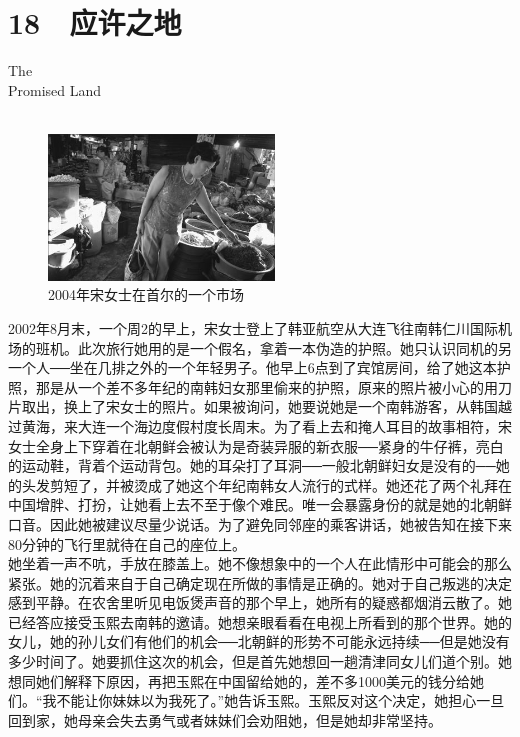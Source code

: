 \fancyhead[RO]{{\tiny{\textcolor{Gray}{\FA \ }}}\thepage}
\fancyhead[LE]{{\tiny{\textcolor{Gray}{\FA \ }}}\thepage}
\fancyfoot[LE,RO]{}
\fancyfoot[LO,CE]{}
\fancyfoot[CO,RE]{}
\chapter*{18 {\FA } 应许之地}
\vspace{5mm}
\begin{flushright}
	\textcolor{PinYinColor}{\EN \huge{The\\
	Promised Land\\
	\ \\}}
\end{flushright}
\begin{figure}[!htbp]
\centering
\includegraphics[width=6cm]{./Chapters/Images/18.jpg}
\caption*{2004年宋女士在首尔的一个市场}
\end{figure}


2002年8月末，一个周2的早上，宋女士登上了韩亚航空从大连飞往南韩仁川国际机场的班机。此次旅行她用的是一个假名，拿着一本伪造的护照。她只认识同机的另一个人──坐在几排之外的一个年轻男子。他早上6点到了宾馆房间，给了她这本护照，那是从一个差不多年纪的南韩妇女那里偷来的护照，原来的照片被小心的用刀片取出，换上了宋女士的照片。如果被询问，她要说她是一个南韩游客，从韩国越过黄海，来大连一个海边度假村度长周末。为了看上去和掩人耳目的故事相符，宋女士全身上下穿着在北朝鲜会被认为是奇装异服的新衣服──紧身的牛仔裤，亮白的运动鞋，背着个运动背包。她的耳朵打了耳洞──一般北朝鲜妇女是没有的──她的头发剪短了，并被烫成了她这个年纪南韩女人流行的式样。她还花了两个礼拜在中国增胖、打扮，让她看上去不至于像个难民。唯一会暴露身份的就是她的北朝鲜口音。因此她被建议尽量少说话。为了避免同邻座的乘客讲话，她被告知在接下来80分钟的飞行里就待在自己的座位上。\\

她坐着一声不吭，手放在膝盖上。她不像想象中的一个人在此情形中可能会的那么紧张。她的沉着来自于自己确定现在所做的事情是正确的。她对于自己叛逃的决定感到平静。在农舍里听见电饭煲声音的那个早上，她所有的疑惑都烟消云散了。她已经答应接受玉熙去南韩的邀请。她想亲眼看看在电视上所看到的那个世界。她的女儿，她的孙儿女们有他们的机会──北朝鲜的形势不可能永远持续──但是她没有多少时间了。她要抓住这次的机会，但是首先她想回一趟清津同女儿们道个别。她想同她们解释下原因，再把玉熙在中国留给她的，差不多1000美元的钱分给她们。“我不能让你妹妹以为我死了。”她告诉玉熙。玉熙反对这个决定，她担心一旦回到家，她母亲会失去勇气或者妹妹们会劝阻她，但是她却非常坚持。\\

